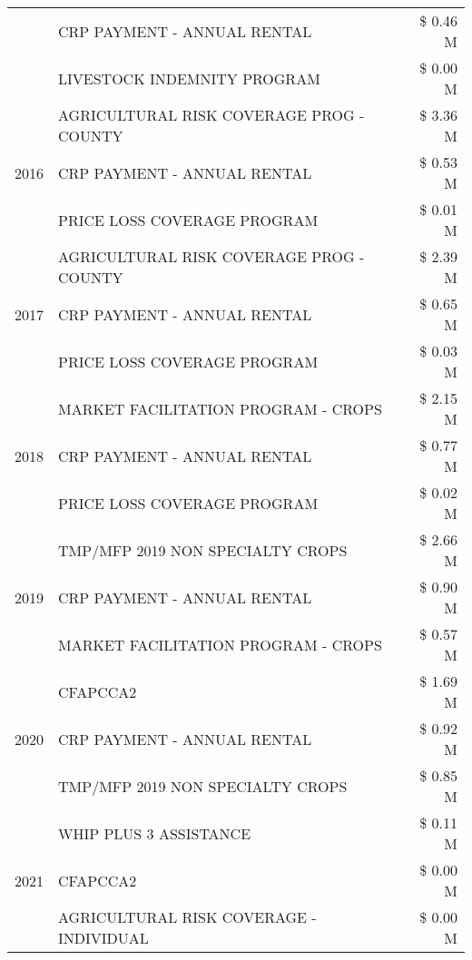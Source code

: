 \begin{tabular}{llr}
 & CRP PAYMENT - ANNUAL RENTAL & \$ 0.46 M \\
 & LIVESTOCK INDEMNITY PROGRAM & \$ 0.00 M \\
\cline{1-3}
\multirow[t]{3}{*}{2016} & AGRICULTURAL RISK COVERAGE PROG - COUNTY      & \$ 3.36 M \\
 & CRP PAYMENT - ANNUAL RENTAL                   & \$ 0.53 M \\
 & PRICE LOSS COVERAGE PROGRAM                   & \$ 0.01 M \\
\cline{1-3}
\multirow[t]{3}{*}{2017} & AGRICULTURAL RISK COVERAGE PROG - COUNTY & \$ 2.39 M \\
 & CRP PAYMENT - ANNUAL RENTAL & \$ 0.65 M \\
 & PRICE LOSS COVERAGE PROGRAM & \$ 0.03 M \\
\cline{1-3}
\multirow[t]{3}{*}{2018} & MARKET FACILITATION PROGRAM - CROPS & \$ 2.15 M \\
 & CRP PAYMENT - ANNUAL RENTAL & \$ 0.77 M \\
 & PRICE LOSS COVERAGE PROGRAM & \$ 0.02 M \\
\cline{1-3}
\multirow[t]{3}{*}{2019} & TMP/MFP 2019 NON SPECIALTY CROPS & \$ 2.66 M \\
 & CRP PAYMENT - ANNUAL RENTAL & \$ 0.90 M \\
 & MARKET FACILITATION PROGRAM - CROPS & \$ 0.57 M \\
\cline{1-3}
\multirow[t]{3}{*}{2020} & CFAPCCA2 & \$ 1.69 M \\
 & CRP PAYMENT - ANNUAL RENTAL & \$ 0.92 M \\
 & TMP/MFP 2019 NON SPECIALTY CROPS & \$ 0.85 M \\
\cline{1-3}
\multirow[t]{3}{*}{2021} & WHIP PLUS 3 ASSISTANCE & \$ 0.11 M \\
 & CFAPCCA2 & \$ 0.00 M \\
 & AGRICULTURAL RISK COVERAGE - INDIVIDUAL & \$ 0.00 M \\
\cline{1-3}
\bottomrule
\end{tabular}
